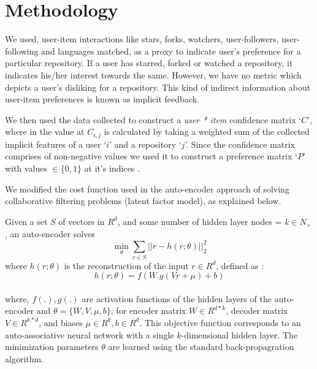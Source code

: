 \documentclass[conference]{IEEEtran}
\begin{document}
\section{\textbf{Methodology}}
We used, user-item interactions like stars, forks, watchers, user-followers, user-following and languages matched, as a proxy to indicate user's preference for a particular repository. If a user has starred, forked or watched a repository, it indicates his/her interest towards the same. However, we have no metric which depicts a user's disliking for a repository. This kind of indirect information about user-item preferences is known as implicit feedback.

We then used the data collected to construct a \textit{user * item} confidence matrix `$C$', where in the value at $C_{i,j}$ is calculated by taking a weighted sum of the collected implicit features of a user `$i$' and a repository `$j$'. Since the confidence matrix comprises of non-negative values we used it to construct a preference matrix `$P$' with values $\in \{0, 1\}$ at it's indices .

We modified the cost function used in the auto-encoder approach of solving collaborative filtering problems (latent factor model)\cite{paper1}, as explained below.

Given a set $S$ of vectors in $R^d$, and some number of hidden layer nodes = $k \in N_+$, an auto-encoder solves\\
    \[ \min_{\theta} \sum_{r \in S} || r - h(r;\theta) ||_2^2 \]
where $h(r;\theta)$ is the reconstruction of the input $r \in R^d$, defined as :
    \[ h(r;\theta) = f(W . g(Vr + \mu) + b) \]\\
where, $f(.),g(.)$ are activation functions of the hidden layers of the auto-encoder and $\theta = \{W, V, \mu, b\}$; for encoder matrix $W \in R^{d * k}$, decoder matrix $V \in R^{k * d}$, and biases $\mu \in R^k, b \in R^d$. This objective function corresponds to an auto-associative neural network with a single $k$-dimensional hidden layer. The minimization parameters $\theta$ are learned using the standard back-propagration algorithm.
\end{document}
